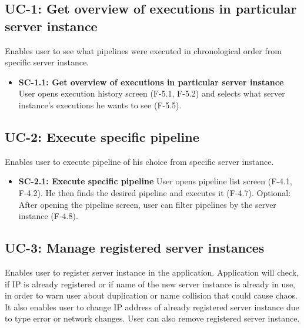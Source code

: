 \subsection*{UC-1: Get overview of executions in particular server instance}
Enables user to see what pipelines were executed in chronological order from specific server instance.

\begin{itemize}
\item \textbf{SC-1.1: Get overview of executions in particular server instance}
User opens execution history screen (F-5.1, F-5.2) and selects what server instance's executions he wants to see (F-5.5).

\end{itemize}

\subsection*{UC-2: Execute specific pipeline}
Enables user to execute pipeline of his choice from specific server instance.

\begin{itemize}
\item \textbf{SC-2.1: Execute specific pipeline}
User opens pipeline list screen (F-4.1, F-4.2). He then finds the desired pipeline and executes it (F-4.7). Optional: After opening the pipeline screen, user can filter pipelines by the server instance (F-4.8).

\end{itemize}

\subsection*{UC-3: Manage registered server instances}
Enables user to register server instance in the application. Application will check, if IP is already registered or if name of the new server instance is already in use, in order to warn user about duplication or name collision that could cause chaos. It also enables user to change IP address of already registered server instance due to type error or network changes. User can also remove registered server instance.

